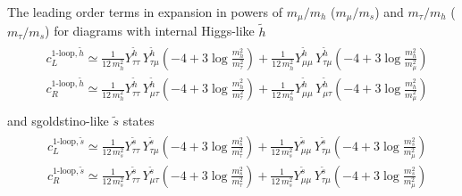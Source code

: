 \documentclass[10pt]{article}
\begin{document}
\noindent
The leading order terms in expansion in powers of $m_{\mu}/m_{h}$ ($m_{\mu}/m_{s}$) and $m_{\tau}/m_{h}$ ($m_{\tau}/m_{s}$) for diagrams with internal Higgs-like $\tilde{h}$ \cite{Harnik}
\begin{eqnarray}
\label{C1looph}
\begin{aligned}
& c_{L}^{\text{1-loop},\tilde{h}} \simeq \frac{1}{12 \, m_h^2} Y_{\tau \tau}^{\tilde{h}} \, Y_{\tau \mu}^{\tilde{h}} \left(-4 + 3\log \frac{m_h^2}{m_\tau^2}\right) + \frac{1}{12 \, m_h^2} Y_{\mu \mu}^{\tilde{h}} \, Y_{\tau \mu}^{\tilde{h}} \left(-4 + 3\log \frac{m_h^2}{m_\mu^2}\right) \\
& c_{R}^{\text{1-loop},\tilde{h}} \simeq \frac{1}{12 \, m_h^2} Y_{\tau \tau}^{\tilde{h}} \, Y_{\mu \tau}^{\tilde{h}} \left(-4 + 3\log \frac{m_h^2}{m_\tau^2}\right) +  \frac{1}{12 \, m_h^2} Y_{\mu \mu}^{\tilde{h}} \, Y_{\mu \tau}^{\tilde{h}} \left(-4 + 3\log \frac{m_h^2}{m_\mu^2}\right)\\
\end{aligned}
\end{eqnarray}
and sgoldstino-like $\tilde{s}$ states
\begin{eqnarray}
\label{C1loops}
\begin{aligned}
& c_{L}^{\text{1-loop},\tilde{s}} \simeq \frac{1}{12 \, m_s^2} Y_{\tau \tau}^{\tilde{s}} \, Y_{\tau \mu}^{\tilde{s}} \left(-4 + 3\log \frac{m_s^2}{m_\tau^2}\right) + \frac{1}{12 \, m_s^2} Y_{\mu \mu}^{\tilde{s}} \, Y_{\tau \mu}^{\tilde{s}} \left(-4 + 3\log \frac{m_s^2}{m_\mu^2}\right)\\
& c_{R}^{\text{1-loop},\tilde{s}} \simeq \frac{1}{12 \, m_s^2} Y_{\tau \tau}^{\tilde{s}} \, Y_{\mu \tau}^{\tilde{s}} \left(-4 + 3\log \frac{m_s^2}{m_\tau^2}\right) + \frac{1}{12 \, m_s^2} Y_{\mu \mu}^{\tilde{s}} \, Y_{\tau \mu}^{\tilde{s}} \left(-4 + 3\log \frac{m_s^2}{m_\mu^2}\right)\\
\end{aligned}
\end{eqnarray}
\end{document}
